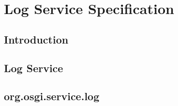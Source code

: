 \chapter{Log Service Specification}
\section{Introduction}
\section{Log Service}
\section{org.osgi.service.log}
